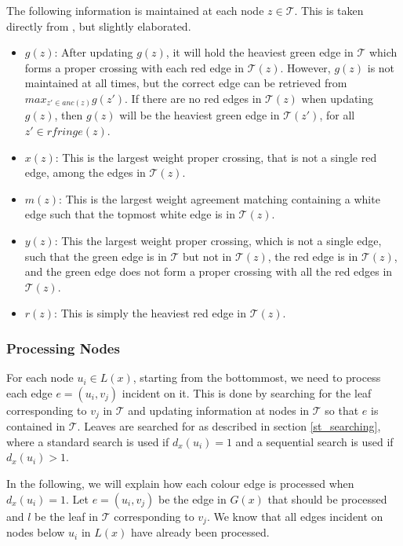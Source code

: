 The following information is maintained at each node $z \in \mathcal{T}$. This is taken directly from \cite{nlogn}, but slightly elaborated.
\begin{itemize}
	\item $g(z)$: After updating $g(z)$, it will hold the heaviest green edge in $\mathcal{T}$ which	forms a proper crossing with each red edge in $\mathcal{T}(z)$.
	\subitem However, $g(z)$ is not maintained at all times, but the correct edge can be retrieved from $max_{z' \in anc(z)}g(z')$.
	\subitem If there are no red edges in $\mathcal{T}(z)$ when updating $g(z)$, then $g(z)$ will be the heaviest green edge in $\mathcal{T}(z')$, for all $z' \in rfringe(z)$.
	\item $x(z)$: This is the largest weight proper crossing, that is not a single red edge, among the edges in $\mathcal{T}(z)$.
	\item $m(z)$: This is the largest weight agreement matching containing a white edge
	such that the topmost white edge is in $\mathcal{T}(z)$.
	\item $y(z)$: This the largest weight proper crossing, which is not a single edge, such that the green edge is in $\mathcal{T}$ but not in $\mathcal{T}(z)$, the red edge is in $\mathcal{T}(z)$, and the green edge does not form a proper crossing with all the red edges in $\mathcal{T}(z)$.
	\item $r(z)$: This is simply the heaviest red edge in $\mathcal{T}(z)$.
\end{itemize}

\subsubsection{Processing Nodes}
For each node $u_i \in L(x)$, starting from the bottommost, we need to process each edge $e = (u_i, v_j)$ incident on it. This is done by searching for the leaf corresponding to $v_j$ in $\mathcal{T}$ and updating information at nodes in $\mathcal{T}$ so that $e$ is contained in $\mathcal{T}$. Leaves are searched for as described in section \ref{st_searching}, where a standard search is used if $d_x(u_i) = 1$ and a sequential search is used if $d_x(u_i) > 1$.

In the following, we will explain how each colour edge is processed when $d_x(u_i) = 1$. Let $e=(u_i,v_j)$ be the edge in $G(x)$ that should be processed and $l$ be the leaf in $\mathcal{T}$ corresponding to $v_j$. We know that all edges incident on nodes below $u_i$ in $L(x)$ have already been processed.

